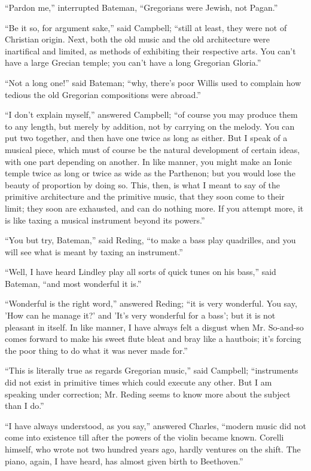 ``Pardon me,'' interrupted Bateman, ``Gregorians were
Jewish, not Pagan.''

``Be it so, for argument sake,'' said Campbell; ``still
at least, they were not of Christian origin. Next, both the old music
and the old architecture were inartifical and limited, as methods of
exhibiting their respective arts. You can't have a large Grecian
temple; you can't have a long Gregorian Gloria.''

``Not a long one!'' said Bateman; ``why, there's poor
Willis used to complain how tedious the old Gregorian compositions
were abroad.''

``I don't explain myself,'' answered Campbell; ``of
course you may produce them to any length, but merely by addition, not
by carrying on the melody. You can put two together, and then have one
twice as long as either. But I speak of a musical piece, which must of
course be the natural development of certain ideas, with one part
depending on another. In like manner, you might make an Ionic temple
twice as long or twice as wide as the Parthenon; but you would
lose the beauty of proportion by doing so. This, then, is what I meant
to say of the primitive architecture and the primitive music, that
they soon come to their limit; they soon are exhausted, and can do
nothing more. If you attempt more, it is like taxing a musical
instrument beyond its powers.''

``You but try, Bateman,'' said Reding, ``to make a bass
play quadrilles, and you will see what is meant by taxing an
instrument.''

``Well, I have heard Lindley play all sorts of quick tunes on
his bass,'' said Bateman, ``and most wonderful it is.''

``Wonderful is the right word,'' answered Reding; ``it
is very wonderful. You say, 'How can he manage it?' and 'It's very
wonderful for a bass'; but it is not pleasant in itself. In like
manner, I have always felt a disgust when Mr. So-and-so comes forward
to make his sweet flute bleat and bray like a hautbois; it's forcing
the poor thing to do what it was never made for.''

``This is literally true as regards Gregorian music,'' said
Campbell; ``instruments did not exist in primitive times which
could execute any other. But I am speaking under correction; Mr.
Reding seems to know more about the subject than I do.''

``I have always understood, as you say,'' answered Charles,
``modern music did not come into existence till after the powers
of the violin became known. Corelli himself, who wrote not two hundred
years ago, hardly ventures on the shift. The piano, again, I have
heard, has almost given birth to Beethoven.''

